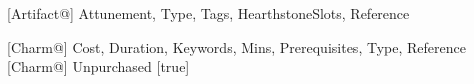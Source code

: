 \makeatother

\makeatletter
{}[Artifact@]{
    Attunement,
    Type,
    Tags,
    HearthstoneSlots,
    Reference
}

\makeatother

\newcommand{\CharmList}{}

\newcommand{\CharmSection}[2]{%
    \mysection{#1}{#2}%
    \CharmGroup{section:#1}%
}

\newcommand{\CharmGroup}[1]{%
    \ifdefempty{\CharmList}{}{%
        \gappto\CharmList{%
            \\%
        }%
    }%
    \gappto\CharmList{%
        \multicolumn{5}{l}{%
            \textbf{\nameref{#1}}%
        } \\%
    }%
}

\makeatletter
{}[Charm@]{
    Cost,
    Duration,
    Keywords,
    Mins,
    Prerequisites,
    Type,
    Reference
}
[Charm@]{
    Unpurchased
}[true]

